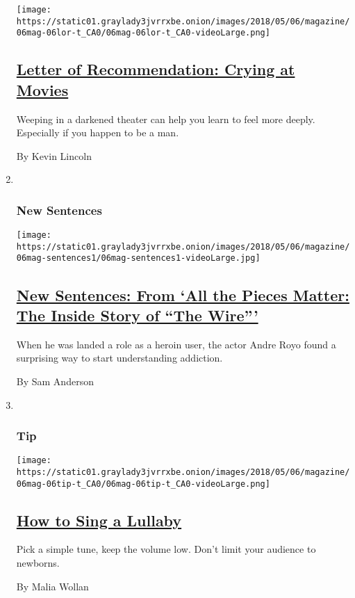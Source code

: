 \begin{enumerate}
  \texttt{[image: https://static01.graylady3jvrrxbe.onion/images/2018/05/06/magazine/06mag-06lor-t\_CA0/06mag-06lor-t\_CA0-videoLarge.png]}

  \hypertarget{letter-of-recommendation-crying-at-movies}{%
  \subsection{\texorpdfstring{\href{/2018/05/02/magazine/letter-of-recommendation-crying-at-movies.html}{Letter
  of Recommendation: Crying at
  Movies}}{Letter of Recommendation: Crying at Movies}}\label{letter-of-recommendation-crying-at-movies}}

  Weeping in a darkened theater can help you learn to feel more deeply.
  Especially if you happen to be a man.

  By Kevin Lincoln
\item ~
  \hypertarget{new-sentences}{%
  \subsubsection{New Sentences}\label{new-sentences}}

  \texttt{[image: https://static01.graylady3jvrrxbe.onion/images/2018/05/06/magazine/06mag-sentences1/06mag-sentences1-videoLarge.jpg]}

  \hypertarget{new-sentences-from-all-the-pieces-matter-the-inside-story-of-the-wire}{%
  \subsection{\texorpdfstring{\href{/2018/05/02/magazine/new-sentences-from-all-the-pieces-matter-the-inside-story-of-the-wire.html}{New
  Sentences: From `All the Pieces Matter: The Inside Story of ``The
  Wire'''}}{New Sentences: From `All the Pieces Matter: The Inside Story of ``The Wire'''}}\label{new-sentences-from-all-the-pieces-matter-the-inside-story-of-the-wire}}

  When he was landed a role as a heroin user, the actor Andre Royo found
  a surprising way to start understanding addiction.

  By Sam Anderson
\item ~
  \hypertarget{tip}{%
  \subsubsection{Tip}\label{tip}}

  \texttt{[image: https://static01.graylady3jvrrxbe.onion/images/2018/05/06/magazine/06mag-06tip-t\_CA0/06mag-06tip-t\_CA0-videoLarge.png]}

  \hypertarget{how-to-sing-a-lullaby}{%
  \subsection{\texorpdfstring{\href{/2018/05/02/magazine/how-to-sing-a-lullaby.html}{How
  to Sing a
  Lullaby}}{How to Sing a Lullaby}}\label{how-to-sing-a-lullaby}}

  Pick a simple tune, keep the volume low. Don't limit your audience to
  newborns.

  By Malia Wollan
\end{enumerate}

